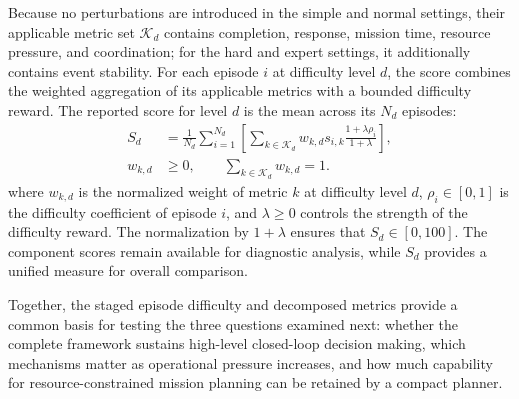 Because no perturbations are introduced in the simple and normal settings,
their applicable metric set $\mathcal{K}_d$ contains completion, response,
mission time, resource pressure, and coordination; for the hard and expert
settings, it additionally contains event stability.
For each episode $i$ at difficulty level $d$, the score combines the weighted
aggregation of its applicable metrics with a bounded difficulty reward. The
reported score for level $d$ is the mean across its $N_d$ episodes:
\begin{equation}
\begin{aligned}
S_d
&=\frac{1}{N_d}\sum_{i=1}^{N_d}
\left[\sum_{k\in\mathcal{K}_d}w_{k,d}s_{i,k}
\frac{1+\lambda\rho_i}{1+\lambda}\right],\\
w_{k,d}&\geq0,\qquad
\sum_{k\in\mathcal{K}_d}w_{k,d}=1.
\end{aligned}
\label{eq:final-evaluation-score}
\end{equation}
where $w_{k,d}$ is the normalized weight of metric $k$ at difficulty level $d$,
$\rho_i\in[0,1]$ is the difficulty coefficient of episode $i$, and $\lambda\geq0$
controls the strength of the difficulty reward. The normalization by
$1+\lambda$ ensures that $S_d\in[0,100]$. The component scores remain
available for diagnostic analysis, while $S_d$ provides a unified measure for
overall comparison.

Together, the staged episode difficulty and decomposed metrics provide a common
basis for testing the three questions examined next: whether the complete
framework sustains high-level closed-loop decision making, which mechanisms
matter as operational pressure increases, and how much capability for
resource-constrained mission planning can be retained by a compact planner.

\endinput

